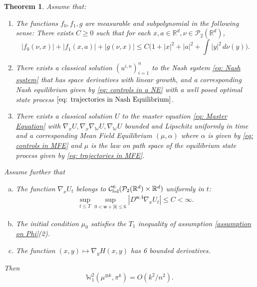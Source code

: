 \documentclass[11pt,reqno]{amsart}
\numberwithin{equation}{section}
\newtheorem{theorem}{Theorem}[section]
\theoremstyle{definition}
\def\R{{\mathbb R}}
\newcommand{\wgrad}{\nabla_{\W}}
\newcommand{\W}{\mathbb W}
\begin{document}
\begin{theorem}
\label{th: chaos for MFG}
Assume that:
    \begin{enumerate} 
    \item The functions $f_0,f_1,g$ are measurable and subpolynomial in the following sense: There exists $C\geq 0$ such that for each $x,a \in \R^d, \nu \in \mathcal P_2(\R^d)$,
    \[|f_0(\nu,x)|+|f_1(x,a)|+|g(\nu,x)|\leq C\Big(1+|x|^2+|a|^2+\int |y|^2\,d\nu(y)\Big).\] 
         \item There exists a classical solution $(u^{i,n})_{i =1}^n$ to the Nash system \eqref{eq: Nash system} that has space derivatives with linear growth, and a corresponding Nash equilibrium given by \eqref{eq: controls in a NE} with a well posed optimal state process $\eqref{eq: trajectories in Nash Equilibrium}$.
         \item  There exists a classical solution $U$ to the master equation \eqref{eq: Master Equation} with $\nabla_x U,\nabla_x \wgrad U,\wgrad U$ bounded and Lipschitz uniformly in time and a corresponding Mean Field Equilibrium $(\mu,\alpha)$ where $\alpha$ is given by \eqref{eq: controls in MFE} and $\mu$ is the law on path space of the equilibrium state process given by \eqref{eq: trajectories in MFE}.
     \end{enumerate}
    Assume further that
    \begin{enumerate}[(a)]
        \item The function $\nabla_x U_t$ belongs to $\mathcal C_{\textup{bd}}^{6}(\mathcal P_2(\R^d)\times \R^d)$ uniformly in $t$:
        \begin{align*}
            \sup_{t\leq T}\sup_{0<\mathsf w +|\boldsymbol{i}|\leq 6}|D^{\mathsf w,\boldsymbol{i}}\nabla_x U_t|\leq C<\infty.
        \end{align*}
        \item The initial condition $\mu_0$ satisfies the $T_1$ inequality of assumption \ref{assumption on Phi}(2).
        \item The function $(x,y)\mapsto \nabla_y H(x,y)$ has 6 bounded derivatives.
    \end{enumerate}
    Then 
\begin{equation*}
\W^2_1(\mu^{\otimes k},\pi^k) = O(k^2/n^2).
\end{equation*}
\end{theorem}
\end{document}

